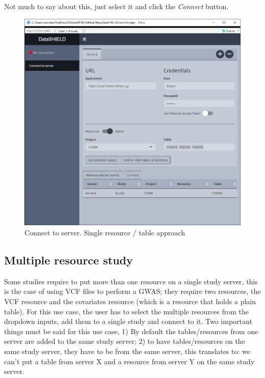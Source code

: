 \documentclass[
]{book}
\begin{document}
Not much to say about this, just select it and click the \emph{Connect} button.

\begin{figure}

{\centering \includegraphics[width=12.68in]{images/data_entry5} 

}

\caption{Connect to server. Single resource / table approach}\label{fig:dataentry5}
\end{figure}

\hypertarget{multiple-resource-study}{%
\subsection{Multiple resource study}\label{multiple-resource-study}}

Some studies require to put more than one resource on a single study server, this is the case of using VCF files to perform a GWAS; they require two resources, the VCF resource and the covariates resource (which is a resource that holds a plain table). For this use case, the user has to select the multiple resources from the dropdown inputs, add them to a single study and connect to it. Two important things must be said for this use case, 1) By default the tables/resources from one server are added to the same study server; 2) to have tables/resources on the same study server, they have to be from the same server, this translates to: we can't put a table from server X and a resource from server Y on the same study server.
\end{document}
